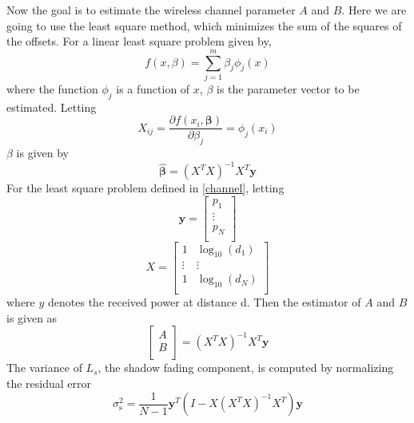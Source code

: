 Now the goal is to estimate the wireless channel parameter $A$ and $B$. Here we are going to use the least square method, which minimizes the sum of the squares of the offsets. For a linear least square problem given by,
\begin{equation*}
f(x, \beta) = \sum_{j = 1}^m \beta_j \phi_j(x)
\end{equation*}
where the function  $\phi _{j}$ is a function of $x$, $\beta$ is the parameter vector to be estimated.
Letting 
\begin{equation*}
X_{ij}= \frac{\partial f(x_i,\boldsymbol \beta)}{\partial \beta_j} = \phi_j(x_{i})
\end{equation*}
$\beta$ is given by
\begin{equation*}
\boldsymbol{\hat\beta} =( X ^TX)^{-1}X^{T}\boldsymbol y
\end{equation*}
For the least square problem defined in \ref{channel}, letting 
\begin{equation*}
\boldsymbol y=
\begin{bmatrix*}
	p_{1} \\
	\vdots \\
	p_{N} \\
\end{bmatrix*}
\end{equation*}
\begin{equation*}
X=
\begin{bmatrix*}
1 & \log_{10}(d_{1})  \\
\vdots & \vdots \\
1 & \log_{10}(d_{N}) \\
\end{bmatrix*}
\end{equation*}
where $y$ denotes the received power at distance d. Then the estimator of $A$ and $B$ is given as
\begin{equation*}
\begin{bmatrix*}
A \\
B \\
\end{bmatrix*}
=( X ^TX)^{-1}X^{T}\boldsymbol y
\end{equation*}
The variance of $L_{s}$, the shadow fading component, is computed by normalizing the residual error
\begin{equation*}
\sigma_{\mathrm{s}}^2= \frac{1}{N-1} \boldsymbol y^{T}(I-X( X ^TX)^{-1}X^{T})\boldsymbol y
\end{equation*}


